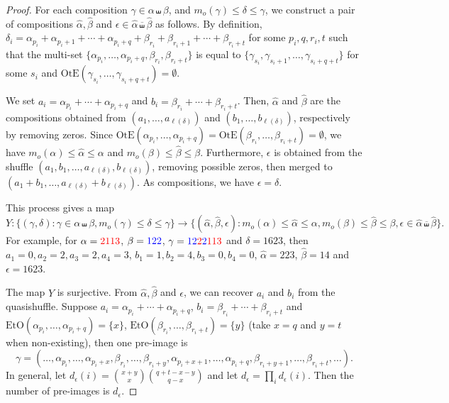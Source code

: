 \documentclass[12pt]{amsart}
\numberwithin{equation}{section}
\newcommand{\OtE}{\mathrm{OtE}}
\newcommand{\EtO}{\mathrm{EtO}}
\begin{document}
\begin{proof}
	For each composition $\gamma\in\alpha\shuffle\beta$, and $m_o(\gamma)\leq\delta\leq\gamma$, we construct a pair of compositions $\hat{\alpha},\hat{\beta}$ and $\epsilon\in\hat{\alpha}\overline{\shuffle}\hat{\beta}$ as follows. By definition, $\delta_i=\alpha_{p_i}+\alpha_{p_i+1}+\cdots+\alpha_{p_i+q}+\beta_{r_i}+\beta_{r_i+1}+\cdots+\beta_{r_i+t}$ for some $p_i,q,r_i,t$ such that the multi-set $\{\alpha_{p_i},\dots,\alpha_{p_i+q},\beta_{r_i},\beta_{r_i+t}\}$ is equal to $\{\gamma_{s_i},\gamma_{s_i+1},\dots,\gamma_{s_i+q+t}\}$ for some $s_i$ and $\OtE(\gamma_{s_i},\dots,\gamma_{s_i+q+t})=\emptyset$.
	
	We set $a_i=\alpha_{p_i}+\cdots+\alpha_{p_i+q}$ and $b_i=\beta_{r_i}+\cdots+\beta_{r_i+t}$. Then, $\hat{\alpha}$ and $\hat{\beta}$ are the compositions obtained from $(a_1,\dots,a_{\ell(\delta)})$ and $(b_1,\dots,b_{\ell(\delta)})$, respectively by removing zeros. Since $\OtE(\alpha_{p_i},\dots,\alpha_{p_i+q})=\OtE(\beta_{r_i},\dots,\beta_{r_i+t})=\emptyset$, we have $m_o(\alpha)\leq\hat{\alpha}\leq\alpha$ and $m_o(\beta)\leq\hat{\beta}\leq\beta$. Furthermore, $\epsilon$ is obtained from the shuffle $(a_1,b_1,\dots,a_{\ell(\delta)},b_{\ell(\delta)})$, removing possible zeros, then merged to $(a_1+b_1,\dots,a_{\ell(\delta)}+b_{\ell(\delta)})$. As compositions, we have $\epsilon=\delta$.
	
	This process gives a map
	$$Y:\{(\gamma,\delta):\gamma\in\alpha\shuffle\beta,m_o(\gamma)\leq\delta\leq\gamma\}\to\{(\hat{\alpha},\hat{\beta},\epsilon):m_o(\alpha)\leq\hat{\alpha}\leq\alpha,m_o(\beta)\leq\hat{\beta}\leq\beta,\epsilon\in\hat{\alpha}\overline{\shuffle}\hat{\beta}\}.$$
	For example, for $\alpha={\color{red}2113}$, $\beta={\color{blue}122}$, $\gamma={\color{blue}12}{\color{red}2}{\color{blue}2}{\color{red}113}$ and $\delta=1623$, then $a_1=0,a_2=2,a_3=2,a_4=3$, $b_1=1,b_2=4,b_3=0,b_4=0$, $\hat{\alpha}=223$, $\hat{\beta}=14$ and $\epsilon=1623$.
	
	The map $Y$ is surjective. From $\hat{\alpha},\hat{\beta}$ and $\epsilon$, we can recover $a_i$ and $b_i$ from the  quasishuffle. Suppose $a_i=\alpha_{p_i}+\cdots+\alpha_{p_i+q}$, $b_i=\beta_{r_i}+\cdots+\beta_{r_i+t}$ and $\EtO(\alpha_{p_i},\dots,\alpha_{p_i+q})=\{x\}$, $\EtO(\beta_{r_i},\dots,\beta_{r_i+t})=\{y\}$ (take $x=q$ and $y=t$ when non-existing), then one pre-image is $$\gamma=(\dots,\alpha_{p_i},\dots,\alpha_{p_i+x},\beta_{r_i},\dots,\beta_{r_i+y},\alpha_{p_i+x+1},\dots,\alpha_{p_i+q},\beta_{r_i+y+1},\dots,\beta_{r_i+t},\dots).$$
	In general, let $d_\epsilon(i)=\binom{x+y}{x}\binom{q+t-x-y}{q-x}$ and let $d_\epsilon=\prod_id_\epsilon(i)$. Then the number of pre-images is $d_\epsilon$.
	

\end{proof}
\end{document}

